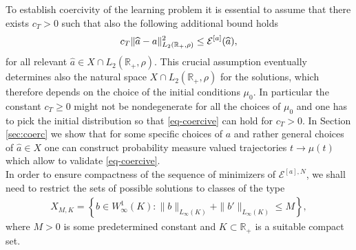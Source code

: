 To establish coercivity of the learning problem
it is essential  to assume that there exists  $c_T>0$ such that also the following additional bound holds
\begin{align}\label{eq-coercive}%
	c_T \| \widehat a - a \|^2_{L_2(\mathbb R_+,\rho)} \leq \Eahat,
\end{align}
for all relevant $\widehat a \in X \cap  L_2(\mathbb R_+,\rho)$. This crucial assumption eventually determines also the natural space $X \cap  L_2(\mathbb R_+,\rho)$ for the solutions,
which therefore depends on the choice of the initial conditions $\mu_0$. In particular the constant $c_T\geq 0$ might not be nondegenerate for all the choices of $\mu_0$
and one has to pick the initial distribution so that \eqref{eq-coercive} can hold for $c_T >0$. 
In Section \ref{sec:coerc} we show that for some specific choices of $a$ and rather general choices of $\widehat a \in X$ one can construct probability measure valued trajectories $t \to \mu(t)$ which allow to validate
\eqref{eq-coercive}.\\
In order to ensure compactness of the sequence of minimizers of $\mathcal E^{[a],N}$, we shall need to restrict the sets of possible solutions to classes of the type
\begin{align*}
X_{M,K} = \left\{b \in W^{1}_{\infty}(K) :
 \|b\|_{L_{\infty}(K)} + \|b'\|_{L_{\infty}(K)} \leq M
 \right\},
\end{align*}
where $M>0$ is some predetermined constant and $K \subset \mathbb R_+$ is a suitable compact set.


